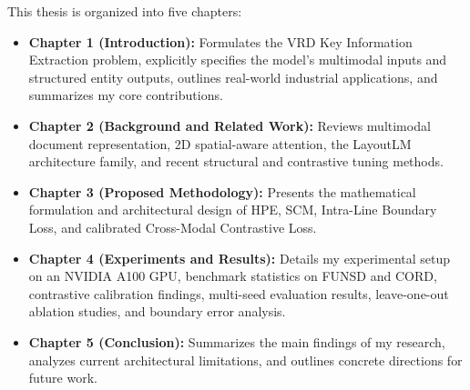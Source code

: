 This thesis is organized into five chapters:
\begin{itemize}
    \item \textbf{Chapter 1 (Introduction):} Formulates the VRD Key Information Extraction problem, explicitly specifies the model's multimodal inputs and structured entity outputs, outlines real-world industrial applications, and summarizes my core contributions.
    \item \textbf{Chapter 2 (Background and Related Work):} Reviews multimodal document representation, 2D spatial-aware attention, the LayoutLM architecture family, and recent structural and contrastive tuning methods.
    \item \textbf{Chapter 3 (Proposed Methodology):} Presents the mathematical formulation and architectural design of HPE, SCM, Intra-Line Boundary Loss, and calibrated Cross-Modal Contrastive Loss.
    \item \textbf{Chapter 4 (Experiments and Results):} Details my experimental setup on an NVIDIA A100 GPU, benchmark statistics on FUNSD and CORD, contrastive calibration findings, multi-seed evaluation results, leave-one-out ablation studies, and boundary error analysis.
    \item \textbf{Chapter 5 (Conclusion):} Summarizes the main findings of my research, analyzes current architectural limitations, and outlines concrete directions for future work.
\end{itemize}
